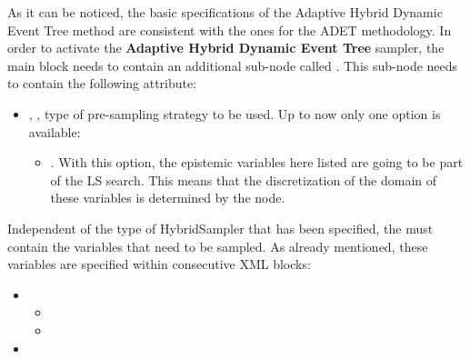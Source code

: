 As it can be noticed, the basic specifications of the Adaptive Hybrid Dynamic Event Tree
method are consistent with the ones for the ADET methodology.
In order to activate the \textbf{Adaptive Hybrid Dynamic Event Tree}  sampler, the main
 block needs to contain an additional
sub-node called .
This sub-node needs to contain the following attribute:
\begin{itemize}
  \item {}, , type of
    pre-sampling strategy to be used.
    Up to now only one option is available:
    \begin{itemize}
      \item {}. With this option, the epistemic variables here listed are going to be part of the LS search.
                                                        This means that the discretization of the domain of these variables is determined by the
                                                         node.
    \end{itemize}
 \end{itemize}
Independent of the type of HybridSampler that has been specified, the
 must contain the variables that need to be sampled.
%
As already mentioned, these variables are specified within consecutive
 XML blocks:
\begin{itemize}
  \item \variableDescription
    \variableChildrenIntro
    \begin{itemize}
      \item \distributionDescription
      \item \functionDescription
    \end{itemize}
  \item \constantVariablesDescription
 \end{itemize}


